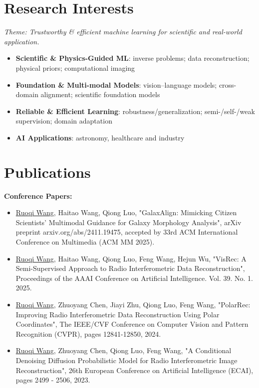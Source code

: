 \documentclass[letterpaper,10pt]{article}
\begin{document}
\begin{CJK}{UTF8}{gbsn}
\section{\Large{Research Interests}}

\textit{Theme: Trustworthy \& efficient machine learning for scientific and real-world application.}

\begin{itemize}
\item \textbf{Scientific \& Physics-Guided ML}: inverse problems; data reconstruction; physical priors; computational imaging
\item \textbf{Foundation \& Multi-modal Models}: vision–language models; cross-domain alignment; scientific foundation models
\item \textbf{Reliable \& Efficient Learning}: robustness/generalization; semi-/self-/weak supervision; domain adaptation
\item \textbf{AI Applications}: astronomy, healthcare and industry
\end{itemize}

\section{\Large{Publications}}

\textbf{Conference Papers:}
 \begin{itemize}
    \item{
    \underline{Ruoqi Wang}, Haitao Wang, Qiong Luo, "{GalaxAlign: Mimicking Citizen Scientists' Multimodal Guidance for Galaxy Morphology Analysis}", arXiv preprint arxiv.org/abs/2411.19475, accepted by 33rd ACM International Conference on Multimedia (ACM MM 2025).
    }
    
    \item{
    \underline{Ruoqi Wang}, Haitao Wang, Qiong Luo, Feng Wang, Hejun Wu, "{VisRec: A Semi-Supervised Approach to Radio Interferometric Data Reconstruction}", Proceedings of the AAAI Conference on Artificial Intelligence. Vol. 39. No. 1. 2025.
    }
    
    \item{
    \underline{Ruoqi Wang}, Zhuoyang Chen, Jiayi Zhu, Qiong Luo, Feng Wang, "{PolarRec: Improving Radio Interferometric Data Reconstruction Using Polar Coordinates}", The IEEE/CVF Conference on Computer Vision and Pattern Recognition (CVPR), pages 12841-12850, 2024. 
    }

    \item{
    \underline{Ruoqi Wang}, Zhuoyang Chen, Qiong Luo, Feng Wang, "{A Conditional Denoising Diffusion Probabilistic Model for Radio Interferometric Image Reconstruction}", 26th European Conference on Artificial Intelligence (ECAI), pages 2499 - 2506, 2023.
    }


\end{itemize}
\end{CJK}
\end{document}
